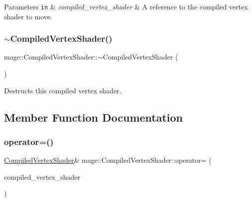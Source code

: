 \begin{DoxyParams}[1]{Parameters}
\mbox{\tt in}  & {\em compiled\+\_\+vertex\+\_\+shader} & A reference to the compiled vertex shader to move. \\
\hline
\end{DoxyParams}
\hypertarget{structmage_1_1_compiled_vertex_shader_af909e9e38ec2eef93a77aeac993e4755}{}\label{structmage_1_1_compiled_vertex_shader_af909e9e38ec2eef93a77aeac993e4755} 
\subsubsection{\texorpdfstring{$\sim$\+Compiled\+Vertex\+Shader()}{~CompiledVertexShader()}}
{\footnotesize\ttfamily mage\+::\+Compiled\+Vertex\+Shader\+::$\sim$\+Compiled\+Vertex\+Shader (\begin{DoxyParamCaption}{ }\end{DoxyParamCaption})\hspace{0.3cm}{\ttfamily [default]}}

Destructs this compiled vertex shader. 

\subsection{Member Function Documentation}
\hypertarget{structmage_1_1_compiled_vertex_shader_a9ce8c846d9c29ffd67a19cffd362b709}{}\label{structmage_1_1_compiled_vertex_shader_a9ce8c846d9c29ffd67a19cffd362b709} 
\subsubsection{\texorpdfstring{operator=()}{operator=()}\hspace{0.1cm}{\footnotesize\ttfamily [1/2]}}
{\footnotesize\ttfamily \hyperlink{structmage_1_1_compiled_vertex_shader}{Compiled\+Vertex\+Shader}\& mage\+::\+Compiled\+Vertex\+Shader\+::operator= (\begin{DoxyParamCaption}\item[{const \hyperlink{structmage_1_1_compiled_vertex_shader}{Compiled\+Vertex\+Shader} \&}]{compiled\+\_\+vertex\+\_\+shader }\end{DoxyParamCaption})\hspace{0.3cm}{\ttfamily [delete]}}

